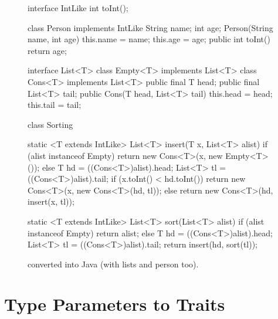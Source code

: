 \documentclass{book}
\begin{document}
\begin{figure}
\begin{javacode}
interface IntLike {
  int toInt();
}

class Person implements IntLike {
  String name;
  int age;
  Person(String name, int age) { this.name = name; this.age = age; }
  public int toInt() { return age; }
}

interface List<T>  { }
class Empty<T> implements List<T> { }
class Cons<T> implements List<T> {
  public final T head;
  public final List<T> tail;
  public Cons(T head, List<T> tail) {
    this.head = head;
    this.tail = tail;
  }
}

class Sorting {

  static <T extends IntLike> List<T> insert(T x, List<T> alist) {
    if (alist instanceof Empty) {
      return new Cons<T>(x, new Empty<T>());
    }
    else {
      T hd = ((Cons<T>)alist).head;
      List<T> tl = ((Cons<T>)alist).tail;
      if (x.toInt() < hd.toInt()) {
        return new Cons<T>(x, new Cons<T>(hd, tl));
      }
      else {
        return new Cons<T>(hd, insert(x, tl));
      }
    }
  }

  static <T extends IntLike> List<T> sort(List<T> alist) {
    if (alist instanceof Empty) {
      return alist;
    }
    else {
      T hd = ((Cons<T>)alist).head;
      List<T> tl = ((Cons<T>)alist).tail;
      return insert(hd, sort(tl));
    }
  }

}
\end{javacode}
\caption{ converted into Java (with lists and person too).}
\label{sorting_java_omg}
\end{figure}

\section{Type Parameters to Traits}
\end{document}
